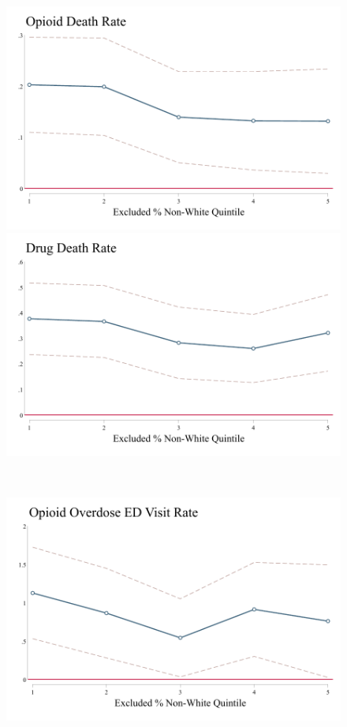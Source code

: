 \documentclass[12pt]{article}
\begin{document}
		\newpage
		\FloatBarrier
		\begin{figure}[h]
			\begin{minipage}[c]{0.48\linewidth}
				\centering
								\includegraphics[width=\linewidth]{../results/appendix/figures/opioid_by_pnw_quintile.pdf}
			  	\includegraphics[width=\linewidth]{../results/appendix/figures/drug_by_pnw_quintile.pdf}
			\end{minipage}
			~
			\hspace{0.05cm}
			\begin{minipage}[c]{0.48\linewidth}\centering
			  \centering
			  \includegraphics[width=\linewidth]{../results/appendix/figures/op_ovr_by_pnw_quintile.pdf}

\end{minipage}
\end{figure}
\end{document}
